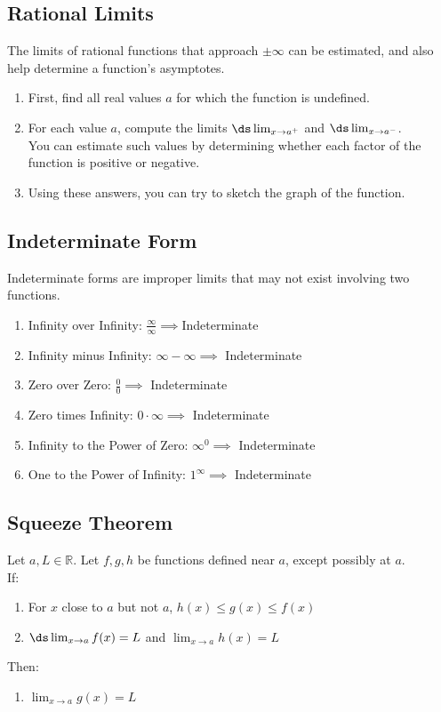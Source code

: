 \documentclass{article}
\begin{document}
\subsection{Rational Limits}
The limits of rational functions that approach $\pm \infty$ can be estimated, and also help determine a function's asymptotes.
\begin{enumerate}
    \item First, find all real values $a$ for which the function is undefined.
    \item For each value $a$, compute the limits $\ds \lim_{x \to a^+}$ and $\ds \lim_{x \to a^-}$.\\
    You can estimate such values by determining whether each factor of the function is positive or negative.
    \item Using these answers, you can try to sketch the graph of the function.
\end{enumerate}
\subsection{Indeterminate Form}
Indeterminate forms are improper limits that may not exist involving two functions.
\begin{enumerate}
    \item Infinity over Infinity: $\frac{\infty}{\infty} \implies $Indeterminate
    \item Infinity minus Infinity: $\infty - \infty \implies$ Indeterminate
    \item Zero over Zero: $\frac{0}{0} \implies$ Indeterminate
    \item Zero times Infinity: $0 \cdot \infty \implies$ Indeterminate
    \item Infinity to the Power of Zero: $\infty^0 \implies$ Indeterminate
    \item One to the Power of Infinity: $1^\infty \implies$ Indeterminate
\end{enumerate}
\subsection {Squeeze Theorem}
Let $a, L \in \mathbb{R}$. Let $f, g, h$ be functions defined near $a$, except possibly at $a$.\\
If:
\begin{enumerate}
    \item For $x$ close to $a$ but not $a$, $h(x) \leq g(x) \leq f(x)$
    \item $\ds \lim_{x \to a} f(x) = L$ and $\lim_{x \to a} h(x) = L$
\end{enumerate}
Then:
\begin{enumerate}
    \item $\lim_{x \to a} g(x) = L$
\end{enumerate}
\end{document}
